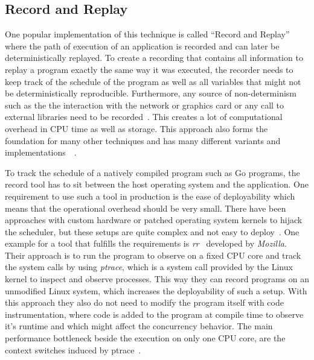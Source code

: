 \documentclass[conference]{IEEEtran}
\begin{document}
\subsection{Record and Replay}
One popular implementation of this technique is called ``Record and Replay'' where the path of execution of an application is recorded and can later be deterministically replayed.
To create a recording that contains all information to replay a program exactly the same way it was executed, the recorder needs to keep track of the schedule of the program as well as all variables that might not be deterministically reproducible.
Furthermore, any source of non-determinism such as the the interaction with the network or graphics card or any call to external libraries need to be recorded~\cite{lidbury2019sparse}.
This creates a lot of computational overhead in CPU time as well as storage.
This approach also forms the foundation for many other techniques and has many different variants and implementations~\cite{acm2002}~\cite{lidbury2019sparse}.

To track the schedule of a natively compiled program such as Go programs, the record tool has to sit between the host operating system and the application.
One requirement to use such a tool in production is the ease of deployability which means that the operational overhead should be very small.
There have been approaches with custom hardware or patched operating system kernels to hijack the scheduler, but these setups are quite complex and not easy to deploy~\cite{o2017engineering}.
One example for a tool that fulfills the requirements is \emph{rr}~\cite{mozillarr} developed by \emph{Mozilla}.
Their approach is to run the program to observe on a fixed CPU core and track the system calls by using \emph{ptrace}, which is a system call provided by the Linux kernel to inspect and observe processes.
This way they can record programs on an unmodified Linux system, which increases the deployability of such a setup.
With this approach they also do not need to modify the program itself with code instrumentation, where code is added to the program at compile time to observe it's runtime and which might affect the concurrency behavior.
The main performance bottleneck beside the execution on only one CPU core, are the context switches induced by ptrace~\cite{o2017engineering}.
\end{document}
